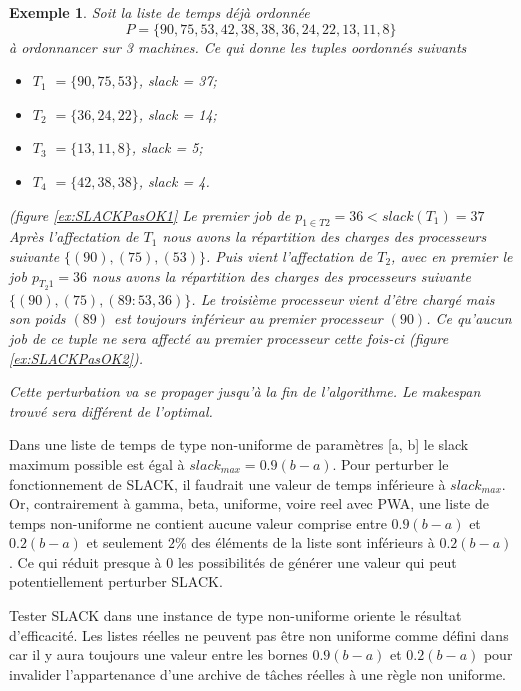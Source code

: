 \documentclass[a4paper,12pt]{report}
\theoremstyle{plain}				%
\newtheorem{example}{Exemple}
\theoremstyle{definition}				%
\newcommand{\lp}[1]{\todo[author=LP,color=yellow,inline]{#1}}
\begin{document}
\begin{example}
 
Soit la liste de temps déjà ordonnée $$P = \{90, 75, 53, 42, 38, 38, 36, 24, 22, 13, 11, 8\}$$ à ordonnancer sur 3 machines. Ce qui donne les tuples oordonnés suivants
\begin{itemize}
	\item $T_1$ $=\{90, 75, 53\}$, slack = 37;
	\item $T_2$ $=\{36, 24, 22\}$, slack = 14;
	\item $T_3$ $=\{13, 11, 8\}$, slack = 5;
	\item $T_4$ $=\{42, 38, 38\}$, slack = 4.
\end{itemize}
(figure \ref{ex:SLACKPasOK1}
Le premier job de $p_{1 \in T2}=36 < slack(T_1)=37$ %
Après l'affectation de $T_1$ nous avons la répartition des charges des 
 processeurs suivante $\{(90), (75), (53)\}$.
Puis vient l'affectation de $T_2$, avec en premier le job $p_{T_2 1}=36$
nous avons la répartition des charges des processeurs suivante $\{(90), (75), (89 : 53,36)\}$. Le troisième processeur vient d'être chargé mais son poids $(89)$ est toujours inférieur au premier processeur $(90)$. Ce qu'aucun job de ce tuple ne sera affecté au premier processeur cette fois-ci (figure \ref{ex:SLACKPasOK2}).

Cette perturbation va se propager jusqu’à la fin de l'algorithme. Le makespan trouvé sera différent de l'optimal. 
\end{example}

Dans une liste de temps de type non-uniforme de paramètres [a, b] le slack maximum possible 
  est égal à $slack_{max} = 0.9(b-a)$. 
Pour perturber le fonctionnement de SLACK, il faudrait une valeur de temps inférieure à $slack_{max}$. 
Or, contrairement à gamma, beta, uniforme, voire reel avec PWA, 
  une liste de temps non-uniforme ne contient aucune valeur comprise entre $0.9(b-a)$ et $0.2(b-a)$ 
  et seulement $2\%$ des éléments de la liste sont inférieurs à $0.2(b-a)$.
Ce qui réduit presque à $0$ les possibilités de générer une valeur qui peut potentiellement perturber SLACK.

Tester SLACK dans une instance de type non-uniforme oriente le résultat d'efficacité.
Les listes réelles ne peuvent pas être non uniforme comme défini dans \cite{frangioni2004multi} 
  car il y aura toujours une valeur entre les bornes $0.9(b-a)$ et $0.2(b-a)$ pour invalider 
  l'appartenance d'une archive de tâches réelles à une règle non uniforme.         
\end{document}
